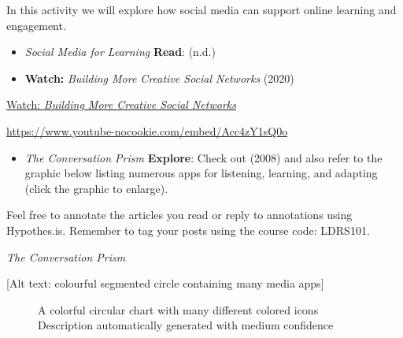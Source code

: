 \documentclass[
  letterpaper,
  DIV=11,
  numbers=noendperiod]{scrreprt}
\providecommand{\tightlist}{%
  \setlength{\itemsep}{0pt}\setlength{\parskip}{0pt}}\usepackage{longtable,booktabs,array}
\begin{document}
\begin{tcolorbox}[enhanced jigsaw, toprule=.15mm, colback=white, colframe=quarto-callout-note-color-frame, bottomtitle=1mm, leftrule=.75mm, coltitle=black, titlerule=0mm, rightrule=.15mm, colbacktitle=quarto-callout-note-color!10!white, left=2mm, title={Learning Activity}, opacitybacktitle=0.6, opacityback=0, breakable, toptitle=1mm, arc=.35mm, bottomrule=.15mm]

In this activity we will explore how social media can support online
learning and engagement.

\begin{itemize}
\tightlist
\item
  \emph{Social Media for Learning} \textbf{Read}: (n.d.)
\item
  \textbf{Watch:} \emph{Building More Creative Social Networks} (2020)
\end{itemize}

\href{https://www.youtube.com/watch?v=Acc4zY1sQ0o}{Watch: \emph{Building
More Creative Social Networks}}

\url{https://www.youtube-nocookie.com/embed/Acc4zY1sQ0o}

\begin{itemize}
\tightlist
\item
  \emph{The Conversation Prism} \textbf{Explore}: Check out (2008) and
  also refer to the graphic below listing numerous apps for listening,
  learning, and adapting (click the graphic to enlarge).
\end{itemize}

Feel free to annotate the articles you read or reply to annotations
using Hypothes.is. Remember to tag your posts using the course code:
LDRS101.

\emph{The Conversation Prism}

{[}Alt text: colourful segmented circle containing many media apps{]}

\begin{figure}[H]

\caption{\label{fig-11327713066xc661527cef}A colorful circular chart
with many different colored icons Description automatically generated
with medium confidence}


\end{figure}
\end{tcolorbox}
\end{document}
